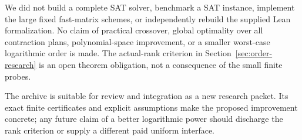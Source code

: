 We did not build a complete SAT solver, benchmark a SAT instance, implement
the large fixed fast-matrix schemes, or independently rebuild the supplied
Lean formalization. No claim of practical crossover, global optimality
over all contraction plans, polynomial-space improvement, or a smaller
worst-case logarithmic order is made. The actual-rank criterion in
Section~\ref{sec:order-research} is an open theorem obligation, not a
consequence of the small finite probes.

The archive is suitable for review and integration as a new research
packet. Its exact finite certificates and explicit assumptions make the
proposed improvement concrete; any future claim of a better logarithmic
power should discharge the rank criterion or supply a different paid
uniform interface.
